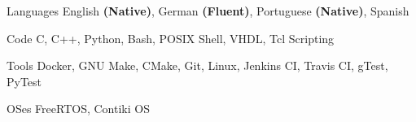 
\begin{cvskills}
  \cvskill
    {Languages} %
    {English \textbf{(Native)}, German \textbf{(Fluent)}, Portuguese \textbf{(Native)}, Spanish} %

  \cvskill
    {Code} %
    {C, C++, Python, Bash, POSIX Shell, VHDL, Tcl Scripting} %

  \cvskill
    {Tools} %
    {Docker, GNU Make, CMake, Git, Linux, Jenkins CI, Travis CI, gTest, PyTest} %

  \cvskill
    {OSes} %
    {FreeRTOS, Contiki OS} %
\end{cvskills}
